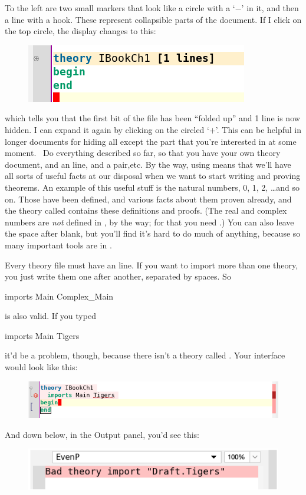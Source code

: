 To the left are two small markers that look like a circle with a `$-$' in it, and then a line with a hook. These represent collapsible parts of the document. If I click on the top circle, the display changes to this:
\begin{figure}[h]
    \centering
    \includegraphics[width=0.5\linewidth]{TEXT/C01//Images/folded-theory.png}
\end{figure}
\noindent which tells you that the first bit of the file has been ``folded up'' and 1 line is now hidden. I can expand it again by clicking on the circled `$+$'. This can be helpful in longer documents for hiding all except the part that you're interested in at some moment. 
\task
Do everything described so far, so that you have your own theory document, and an  line, and a  pair,etc.
\etask
By the way, using  means that we'll have all sorts of useful facts at our disposal when we want to start writing and proving theorems. An example of this useful stuff is the natural numbers, 0, 1, 2, \ldots  and so on. Those have been defined, and various facts about them proven already, and the theory called  contains these definitions and proofs. (The real and complex numbers are \textit{not} defined in , by the way; for that you need .) You can also leave the space after  blank, but you'll find it's hard to do much of anything, because so many important tools are in .

Every theory file must have an  line. If you want to import more than one theory, you just write them one after another, separated by spaces. So 
\begin{IS}    
imports Main Complex_Main
\end{IS}
\noindent
is also valid. If you typed
\begin{IS}    
imports Main Tigers
\end{IS}    
\noindent
it'd be a problem, though, because there isn't a theory called . Your interface would look like this:
\begin{figure}[h]
    \centering
    \includegraphics[width=1\linewidth]{TEXT/C01/Images/tigers.png}
\end{figure}
\newpage
And down below, in the Output panel, you'd see this:
\begin{figure}[h]
    \centering
    \includegraphics[width=0.75\linewidth]{TEXT/C01/Images/tiger-error.png}
\end{figure}

